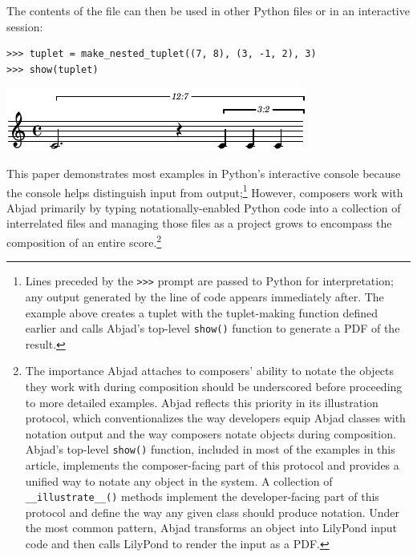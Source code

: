 \documentclass{article}
\begin{document}
\noindent The contents of the file can then be used in other Python files or in an interactive session:

\begin{lstlisting}
>>> tuplet = make_nested_tuplet((7, 8), (3, -1, 2), 3)
>>> show(tuplet)
\end{lstlisting}
\includegraphics{assets/lilypond-4926e77647583925d3a89653f8577025.pdf}

\noindent This paper demonstrates most examples in Python's interactive console because the console helps distinguish input from output;\footnote{Lines preceded by the \texttt{>>>} prompt are passed to Python for interpretation; any output generated by the line of code appears immediately after. The example above creates a tuplet with the tuplet-making function defined earlier and calls Abjad's top-level \texttt{show()} function to generate a PDF of the result.} However, composers work with Abjad primarily by typing notationally-enabled Python code into a collection of interrelated files and managing those files as a project grows to encompass the composition of an entire score.\footnote{The importance Abjad attaches to composers' ability to notate the objects they work with during composition should be underscored before proceeding to more detailed examples. Abjad reflects this priority in its illustration protocol, which conventionalizes the way developers equip Abjad classes with
notation output and the way composers notate objects during
composition. Abjad's top-level \texttt{show()} function, included in most of the examples in this article, implements the composer-facing part of this protocol and provides a unified way to
notate any object in the system. A collection of \texttt{\_\_illustrate\_\_()} methods implement the developer-facing part of this protocol and define the way any given class should produce notation. Under the most common pattern, Abjad transforms an object into LilyPond input code and
then calls LilyPond to render the input as a PDF.}
\end{document}
